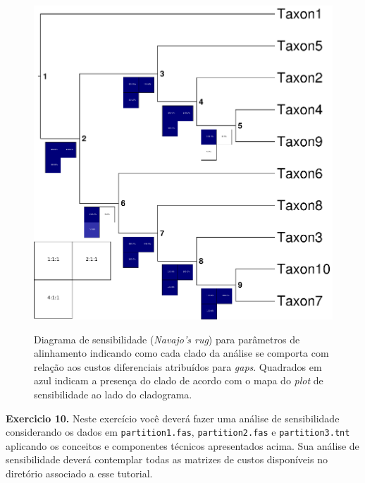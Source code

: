 \begin{refsection}
  \begin{figure}[H]
       \centering
      {\includegraphics[scale=0.9]{figures/tut10/sensibilidade.eps}}
	{\caption[Diagrama de sensibilidade (\textit{Navajo's rug}) para parâmetros de alinhamento.]{Diagrama de sensibilidade (\textit{Navajo's rug}) para parâmetros de alinhamento indicando como cada clado da análise se comporta com relação aos custos diferenciais atribuídos para \textit{gaps}. Quadrados em azul indicam a presença do clado de acordo com o mapa do \textit{plot} de sensibilidade ao lado do cladograma.}\label{tut10:fig:sensitivity}}
  \end{figure}


\begin{blackBlock}{\textbf{Exercicio 10.}}\label{tut10:ex:10.1}
Neste exercício você deverá fazer uma análise de sensibilidade considerando os dados em \texttt{partition1.fas}, \texttt{partition2.fas} e \texttt{partition3.tnt} aplicando os conceitos e componentes técnicos apresentados acima. Sua análise de sensibilidade deverá contemplar todas as matrizes de custos disponíveis no diretório associado a esse tutorial.


\end{blackBlock}
\end{refsection}

